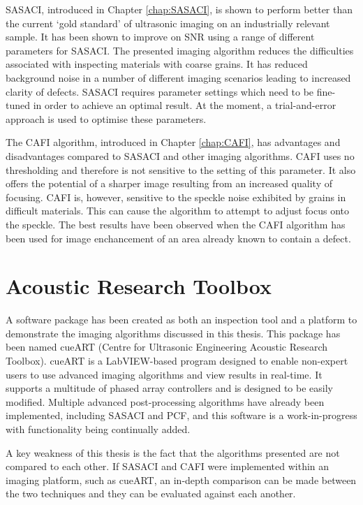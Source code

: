SASACI, introduced in Chapter \ref{chap:SASACI}, is shown to perform better than the current `gold standard' of ultrasonic imaging on an industrially relevant sample. It has been shown to improve on SNR using a range of different parameters for SASACI. The presented imaging algorithm reduces the difficulties associated with inspecting materials with coarse grains. It has reduced background noise in a number of different imaging scenarios leading to increased clarity of defects. SASACI requires parameter settings which need to be fine-tuned in order to achieve an optimal result. At the moment, a trial-and-error approach is used to optimise these parameters.

The CAFI algorithm, introduced in Chapter \ref{chap:CAFI}, has advantages and disadvantages compared to SASACI and other imaging algorithms. CAFI uses no thresholding and therefore is not sensitive to the setting of this parameter. It also offers the potential of a sharper image resulting from an increased quality of focusing. CAFI is, however, sensitive to the speckle noise exhibited by grains in difficult materials. This can cause the algorithm to attempt to adjust focus onto the speckle. The best results have been observed when the CAFI algorithm has been used for image enchancement of an area already known to contain a defect.

\section{Acoustic Research Toolbox}

A software package has been created as both an inspection tool and a platform to demonstrate the imaging algorithms discussed in this thesis. This package has been named cueART (Centre for Ultrasonic Engineering Acoustic Research Toolbox). cueART is a LabVIEW-based program designed to enable non-expert users to use advanced imaging algorithms and view results in real-time. It supports a multitude of phased array controllers and is designed to be easily modified. Multiple advanced post-processing algorithms have already been implemented, including SASACI and PCF, and this software is a work-in-progress with functionality being continually added.

A key weakness of this thesis is the fact that the algorithms presented are not compared to each other. If SASACI and CAFI were implemented within an imaging platform, such as cueART, an in-depth comparison can be made between the two techniques and they can be evaluated against each another.

